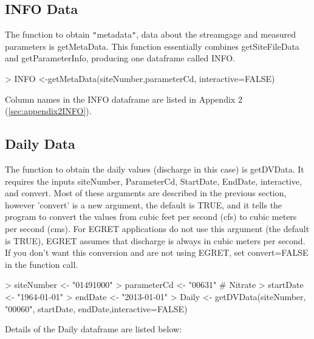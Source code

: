 \documentclass[a4paper,11pt]{article}
\begin{document}
\subsection{INFO Data}
The function to obtain \texttt{"}metadata\texttt{"}, data about the streamgage and measured parameters is getMetaData. This function essentially combines getSiteFileData and getParameterInfo, producing one dataframe called INFO.

\begin{Schunk}
\begin{Sinput}
> INFO <-getMetaData(siteNumber,parameterCd, interactive=FALSE)
\end{Sinput}
\end{Schunk}

Column names in the INFO dataframe are listed in Appendix 2 (\ref{sec:appendix2INFO}).

\subsection{Daily Data}
The function to obtain the daily values (discharge in this case) is getDVData.  It requires the inputs siteNumber, ParameterCd, StartDate, EndDate, interactive, and convert. Most of these arguments are described in the previous section, however 'convert' is a new argument, the default is TRUE, and it tells the program to convert the values from cubic feet per second (cfs) to cubic meters per second (cms). For EGRET applications do not use this argument (the default is TRUE), EGRET assumes that discharge is always in cubic meters per second. If you don't want this conversion and are not using EGRET, set convert=FALSE in the function call. 

\begin{Schunk}
\begin{Sinput}
> siteNumber <- "01491000"
> parameterCd <- "00631"  # Nitrate
> startDate <- "1964-01-01"
> endDate <- "2013-01-01"
> Daily <- getDVData(siteNumber, "00060", startDate, endDate,interactive=FALSE)
\end{Sinput}
\end{Schunk}

Details of the Daily dataframe are listed below:
\end{document}
